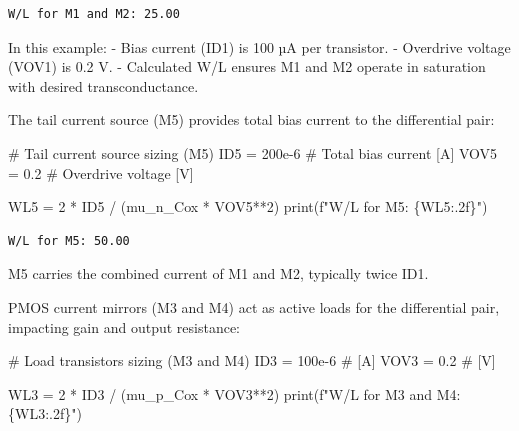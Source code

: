 \documentclass[
  letterpaper,
]{scrbook}
\newenvironment{Shaded}{}{}
\newcommand{\BuiltInTok}[1]{\textcolor[rgb]{0.84,0.23,0.29}{#1}}
\newcommand{\CommentTok}[1]{\textcolor[rgb]{0.42,0.45,0.49}{#1}}
\newcommand{\DecValTok}[1]{\textcolor[rgb]{0.00,0.36,0.77}{#1}}
\newcommand{\FloatTok}[1]{\textcolor[rgb]{0.00,0.36,0.77}{#1}}
\newcommand{\NormalTok}[1]{\textcolor[rgb]{0.14,0.16,0.18}{#1}}
\newcommand{\OperatorTok}[1]{\textcolor[rgb]{0.14,0.16,0.18}{#1}}
\newcommand{\SpecialCharTok}[1]{\textcolor[rgb]{0.00,0.36,0.77}{#1}}
\newcommand{\SpecialStringTok}[1]{\textcolor[rgb]{0.01,0.18,0.38}{#1}}
\begin{document}
\begin{verbatim}
W/L for M1 and M2: 25.00
\end{verbatim}

In this example: - Bias current (ID1) is 100 µA per transistor. -
Overdrive voltage (VOV1) is 0.2 V. - Calculated W/L ensures M1 and M2
operate in saturation with desired transconductance.

The tail current source (M5) provides total bias current to the
differential pair:

\begin{Shaded}
\begin{Highlighting}[]
\CommentTok{\# Tail current source sizing (M5)}
\NormalTok{ID5 }\OperatorTok{=} \FloatTok{200e{-}6}   \CommentTok{\# Total bias current [A]}
\NormalTok{VOV5 }\OperatorTok{=} \FloatTok{0.2}     \CommentTok{\# Overdrive voltage [V]}

\NormalTok{WL5 }\OperatorTok{=} \DecValTok{2} \OperatorTok{*}\NormalTok{ ID5 }\OperatorTok{/}\NormalTok{ (mu\_n\_Cox }\OperatorTok{*}\NormalTok{ VOV5}\OperatorTok{**}\DecValTok{2}\NormalTok{)}
\BuiltInTok{print}\NormalTok{(}\SpecialStringTok{f"W/L for M5: }\SpecialCharTok{\{}\NormalTok{WL5}\SpecialCharTok{:.2f\}}\SpecialStringTok{"}\NormalTok{)}
\end{Highlighting}
\end{Shaded}

\begin{verbatim}
W/L for M5: 50.00
\end{verbatim}

M5 carries the combined current of M1 and M2, typically twice ID1.

PMOS current mirrors (M3 and M4) act as active loads for the
differential pair, impacting gain and output resistance:

\begin{Shaded}
\begin{Highlighting}[]
\CommentTok{\# Load transistors sizing (M3 and M4)}
\NormalTok{ID3 }\OperatorTok{=} \FloatTok{100e{-}6}   \CommentTok{\# [A]}
\NormalTok{VOV3 }\OperatorTok{=} \FloatTok{0.2}     \CommentTok{\# [V]}

\NormalTok{WL3 }\OperatorTok{=} \DecValTok{2} \OperatorTok{*}\NormalTok{ ID3 }\OperatorTok{/}\NormalTok{ (mu\_p\_Cox }\OperatorTok{*}\NormalTok{ VOV3}\OperatorTok{**}\DecValTok{2}\NormalTok{)}
\BuiltInTok{print}\NormalTok{(}\SpecialStringTok{f"W/L for M3 and M4: }\SpecialCharTok{\{}\NormalTok{WL3}\SpecialCharTok{:.2f\}}\SpecialStringTok{"}\NormalTok{)}
\end{Highlighting}
\end{Shaded}
\end{document}
